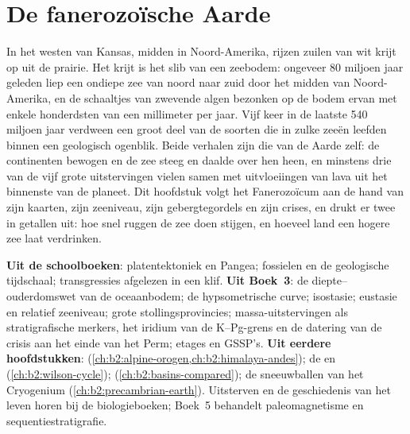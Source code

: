 \chapter{De fanerozoïsche Aarde}\label{ch:b2:phanerozoic-earth}

In het westen van Kansas, midden in Noord-Amerika, rijzen zuilen van wit krijt op uit de
prairie. Het krijt is het slib van een zeebodem: ongeveer 80 miljoen jaar geleden liep een
ondiepe zee van noord naar zuid door het midden van Noord-Amerika, en de schaaltjes van
zwevende algen bezonken op de bodem ervan met enkele honderdsten van een millimeter per jaar. Vijf keer in de
laatste 540 miljoen jaar verdween een groot deel van de soorten die in zulke zeeën leefden binnen een
geologisch ogenblik. Beide verhalen zijn die van de Aarde zelf: de continenten bewogen en de zee steeg en daalde over
hen heen, en minstens drie van de vijf grote uitstervingen vielen samen met uitvloeiingen van lava uit het binnenste van
de planeet. Dit hoofdstuk volgt het Fanerozoïcum aan de hand van zijn kaarten, zijn zeeniveau, zijn
gebergtegordels en zijn crises, en drukt er twee in getallen uit: hoe snel ruggen de zee doen stijgen, en hoeveel
land een hogere zee laat verdrinken.

\begin{recall}
\textbf{Uit de schoolboeken}: platentektoniek en Pangea; fossielen en de geologische
tijdschaal; transgressies afgelezen in een klif. \textbf{Uit Boek~3}: de diepte--ouderdomswet van
de oceaanbodem; de hypsometrische curve; isostasie; eustasie en relatief zeeniveau; grote
stollingsprovincies; massa-uitstervingen als stratigrafische merkers, het iridium van de K--Pg-grens en de
datering van de crisis aan het einde van het Perm; etages en GSSP's. \textbf{Uit eerdere hoofdstukken}: 
(\cref{ch:b2:alpine-orogen,ch:b2:himalaya-andes}); de  en 
(\cref{ch:b2:wilson-cycle});  (\cref{ch:b2:basins-compared}); de sneeuwballen van het
Cryogenium (\cref{ch:b2:precambrian-earth}). Uitsterven en de geschiedenis van het leven horen bij de
biologieboeken; Boek~5 behandelt paleomagnetisme en sequentiestratigrafie.
\end{recall}

